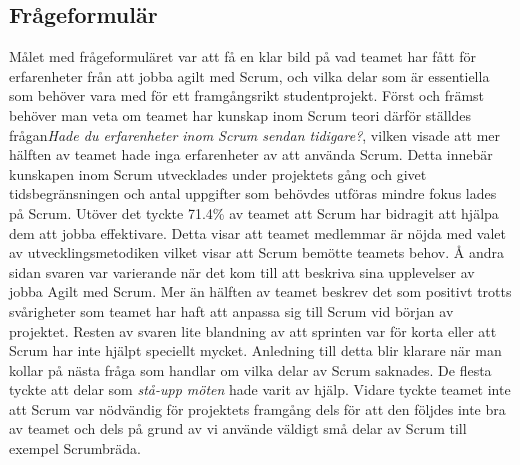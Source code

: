 \subsection{Frågeformulär}
Målet med frågeformuläret var att få en klar bild på vad teamet har fått för erfarenheter från att jobba agilt med Scrum, och vilka delar som är essentiella som behöver vara med för ett framgångsrikt studentprojekt. Först och främst behöver man veta om teamet har kunskap inom Scrum teori därför ställdes frågan\textit{Hade du erfarenheter inom Scrum sendan tidigare?},  vilken visade att mer hälften av teamet hade inga erfarenheter av att använda Scrum. Detta innebär kunskapen inom Scrum utvecklades under projektets gång och givet tidsbegränsningen och antal uppgifter som behövdes utföras mindre fokus lades på Scrum.  Utöver det tyckte 71.4\% av teamet att Scrum har bidragit att hjälpa dem att jobba effektivare. Detta visar att teamet medlemmar är nöjda med valet av utvecklingsmetodiken vilket visar att Scrum bemötte teamets behov. Å andra sidan svaren var varierande när det kom till att beskriva sina upplevelser av jobba Agilt med Scrum. Mer än hälften av teamet beskrev det som positivt trotts svårigheter som teamet har haft att anpassa sig till Scrum vid början av projektet. Resten av svaren lite blandning av att sprinten var för korta eller att Scrum har inte hjälpt speciellt mycket. Anledning till detta blir klarare när man kollar på nästa fråga som handlar om vilka delar av Scrum saknades. De flesta tyckte att delar som \textit{stå-upp möten} hade varit av hjälp. Vidare tyckte teamet inte att Scrum var nödvändig för projektets framgång dels för att den följdes inte bra av teamet och dels på grund av vi använde väldigt små delar av Scrum till exempel Scrumbräda.

